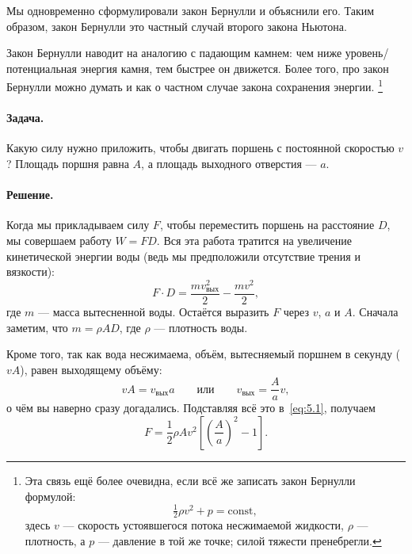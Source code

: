 Мы одновременно сформулировали закон Бернулли и объяснили его.
Таким образом, закон Бернулли это частный случай второго закона Ньютона.

Закон Бернулли наводит на аналогию с падающим камнем: чем ниже уровень/потенциальная энергия камня, тем быстрее он движется.
Более того, про закон Бернулли можно думать и как о частном случае закона сохранения энергии.%
\footnote{Эта связь ещё более очевидна, если всё же записать закон Бернулли формулой: \[\tfrac12\rho v^2 + p = \text{const},\]
здесь $v$ --- скорость устоявшегося потока несжимаемой жидкости, $\rho$ --- плотность, а $p$ --- давление в той же точке; силой тяжести пренебрегли.\pr}

\paragraph{Задача.}
Какую силу нужно приложить, чтобы двигать поршень с постоянной скоростью $v$?
Площадь поршня равна $A$, а площадь выходного отверстия — $a$.

\paragraph{Решение.}
Когда мы прикладываем силу $F$, чтобы переместить поршень на расстояние $D$, мы совершаем работу $W = F D$.
Вся эта работа тратится на увеличение кинетической энергии воды (ведь мы предположили отсутствие трения и вязкости):
\begin{equation}
F \cdot D = \frac{m v_{\text{вых}}^{2}}{2} - \frac{m v^{2}}{2},
\label{eq:5.1}
\end{equation}
где $m$ — масса вытесненной воды.
Остаётся выразить $F$ через $v$, $a$ и $A$.
Сначала заметим, что $m = \rho A D$, где $\rho$ — плотность воды.

Кроме того, так как вода несжимаема, объём, вытесняемый поршнем в секунду ($vA$), равен выходящему объёму:
\[
vA = v_{\text{вых}} a
\qquad\text{или}\qquad
v_{\text{вых}} = \frac{A}{a} v,
\]
о чём вы наверно сразу догадались.
Подставляя всё это в~\eqref{eq:5.1}, получаем
\begin{equation}
F = \frac12\rho A v^{2} \left[ \left(\frac{A}{a}\right)^2  - 1 \right].
\label{eq:5.2}
\end{equation}

